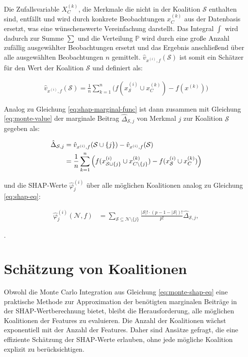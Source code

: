 Die Zufallsvariable $X_{C}^{(k)}$, die Merkmale die nicht in der Koalition $\mathcal{S}$ enthalten sind, 
entfällt und wird durch konkrete Beobachtungen $x_{C}^{(k)}$ aus der Datenbasis ersetzt, 
was eine wünschenswerte Vereinfachung darstellt. Das Integral $\int$ wird dadurch zur Summe $\sum$ und die Verteilung $\mathbb{P}$ wird durch eine große Anzahl zufällig 
ausgewählter Beobachtungen ersetzt und das Ergebnis anschließend über alle ausgewählten Beobachtungen $n$ gemittelt. 
$\hat{v}_{x^{(i)}, f}(\mathcal{S})$ ist somit ein Schätzer für den Wert der Koalition $\mathcal{S}$ und definiert als: 

\begin{align}
    \label{eq:monte-value}
    \hat{v}_{x^{(i)},f}(\mathcal{S}) = \frac{1}{n} \sum_{k=1}^{n} \Big(f(x^{(i)}_{\mathcal{S}} \cup x^{(k)}_{C}) - f(x^{(k)}) \Big)
\end{align}

Analog zu Gleichung \ref{eq:shap-marginal-func} ist dann zusammen mit Gleichung \ref{eq:monte-value} der marginale Beitrag 
$\hat{\Delta}_{\mathcal{S}, j}$ von Merkmal $j$ zur Koalition $\mathcal{S}$ gegeben als: 

\begin{align}
    \hat{\Delta}_{\mathcal{S}, j} &= \hat{v}_{x^{(i)},f}(\mathcal{S} \cup \{j\}) - \hat{v}_{x^{(i)},f}(\mathcal{S}) \\ \notag
        &= \frac{1}{n} \sum_{k=1}^{n} \Big(f(x^{(i)}_{\mathcal{S} \cup \{j\}} \cup x^{(k)}_{C \setminus \{j\}}) - f(x^{(i)}_{\mathcal{S}} \cup x^{(k)}_{C}) \Big)
\end{align}

und die SHAP-Werte $\hat{\varphi}_{j}^{(i)}$ über alle möglichen Koalitionen analog zu Gleichung \ref{eq:shap-eq}:

\begin{align}
    \label{eq:monte-shap-eq}
    \hat{\varphi}^{(i)}_{j} (\mathcal{N}, f) &= \sum_{\mathcal{S} \subseteq \mathcal{N} \setminus \{j\}} \frac{|\mathcal{S}|! \cdot (p - 1 - |\mathcal{S}|)!}{p!}\hat{\Delta}_{\mathcal{S}, j},
\end{align}

\cite[S.36]{Molnar_2023}.

\section{Schätzung von Koalitionen}

Obwohl die Monte Carlo Integration aus Gleichung \ref{eq:monte-shap-eq} eine praktische Methode zur Approximation der benötigten marginalen Beiträge in der 
SHAP-Wertberechnung bietet, bleibt die Herausforderung, alle möglichen Koalitionen der Features zu evaluieren. 
Die Anzahl der Koalitionen wächst exponentiell mit der Anzahl der Features. Daher sind Ansätze gefragt, die eine effiziente Schätzung der SHAP-Werte erlauben, 
ohne jede mögliche Koalition explizit zu berücksichtigen.

